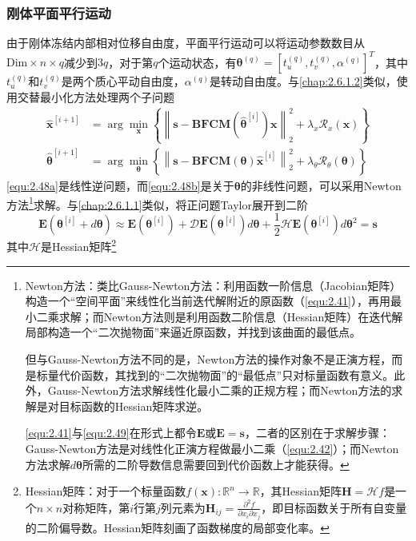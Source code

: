 \documentclass[12pt]{article}
\begin{document}
\subsubsection{刚体平面平行运动}\label{chap:2.6.2.1}
由于刚体冻结内部相对位移自由度，平面平行运动可以将运动参数数目从$\mathrm{Dim}\times n\times q$减少到$3q$，对于第$q$个运动状态，有$\bm{\theta}^{(q)}=[t_u^{(q)},t_v^{(q)},\alpha^{(q)}]^T$，其中$t_u^{(q)}$和$t_v^{(q)}$是两个质心平动自由度，$\alpha^{(q)}$是转动自由度。与\autoref{chap:2.6.1.2}类似，使用交替最小化方法处理两个子问题
\begin{align}
    \hat{\bm{x}}^{[i+1]}&=\arg\min_{\bm{x}}\left\{\left\|\bm{s}-\mathbf{B}\mathbf{F}\mathbf{C}\mathbf{M}\left(\hat{\bm{\theta}}^{[i]}\right)\bm{x}\right\|_2^2+\lambda_x\mathcal{R}_x(\bm{x})\right\}
    \label{equ:2.48a} \\
    \hat{\bm{\theta}}^{[i+1]}&=\arg\min_{\bm{\theta}}\left\{\left\|\bm{s}-\mathbf{B}\mathbf{F}\mathbf{C}\mathbf{M}(\bm{\theta})\hat{\bm{x}}^{[i]}\right\|_2^2+\lambda_\theta\mathcal{R}_\theta(\bm{\theta})\right\}
    \label{equ:2.48b}
\end{align}
\autoref{equ:2.48a}是线性逆问题，而\autoref{equ:2.48b}是关于$\bm{\theta}$的非线性问题，可以采用Newton方法\footnote{Newton方法：类比Gauss-Newton方法：利用函数一阶信息（Jacobian矩阵）构造一个“空间平面”来线性化当前迭代解附近的原函数（\autoref{equ:2.41}），再用最小二乘求解；而Newton方法则是利用函数二阶信息（Hessian矩阵）在迭代解局部构造一个“二次抛物面”来逼近原函数，并找到该曲面的最低点。

但与Gauss-Newton方法不同的是，Newton方法的操作对象不是正演方程，而是标量代价函数，其找到的“二次抛物面”的“最低点”只对标量函数有意义。此外，Gauss-Newton方法求解线性化最小二乘的正规方程；而Newton方法的求解是对目标函数的Hessian矩阵求逆。

\autoref{equ:2.41}与\autoref{equ:2.49}在形式上都令$\bm{E}$或$\mathbf{E}=\bm{s}$，二者的区别在于求解步骤：Gauss-Newton方法是对线性化正演方程做最小二乘（\autoref{equ:2.42}）；而Newton方法求解$d\bm{\theta}$所需的二阶导数信息需要回到代价函数上才能获得。}求解。与\autoref{chap:2.6.1.1}类似，将正问题Taylor展开到二阶
\begin{equation}
    \mathbf{E}\left(\bm{\theta}^{[i]}+d\bm{\theta}\right)\approx \mathbf{E}\left(\bm{\theta}^{[i]}\right)+\mathcal{D}\mathbf{E}\left(\bm{\theta}^{[i]}\right)d\bm{\theta}+\frac{1}{2}\mathcal{H}\mathbf{E}\left(\bm{\theta}^{[i]}\right)d\bm{\theta}^2=\bm{s}
    \label{equ:2.49}
\end{equation}
其中$\mathcal{H}$是Hessian矩阵\footnote{Hessian矩阵：对于一个标量函数$f(\bm{x}):\mathbb{R}^n\to\mathbb{R}$，其Hessian矩阵$\mathbf{H}=\mathcal{H}f$是一个$n\times n$对称矩阵，第$i$行第$j$列元素为$\mathbf{H}_{ij}=\frac{\partial^2 f}{\partial x_i\partial x_j}$，即目标函数关于所有自变量的二阶偏导数。Hessian矩阵刻画了函数梯度的局部变化率。}
\end{document}
